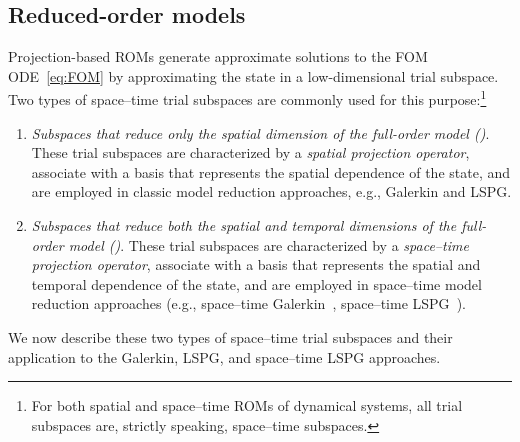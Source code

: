 \documentclass[3p,computermodern,10pt]{elsarticle}
\begin{document}
\subsection{Reduced-order models}
Projection-based ROMs generate approximate solutions to the FOM
	ODE~\eqref{eq:FOM} by approximating the state in a low-dimensional trial
	subspace. Two types of space--time trial subspaces are commonly used for
	this purpose:\footnote{For both spatial and space--time ROMs of dynamical systems, all trial subspaces are, strictly speaking, space--time subspaces.} 
\begin{enumerate} 
	\item \textit{Subspaces that reduce only the spatial dimension of the full-order
		model (\spatialAcronym)}. These trial subspaces are characterized by a \textit{spatial projection operator}, associate with a basis that represents the spatial dependence of the state, and are employed in classic model reduction approaches, e.g., Galerkin and LSPG. %
	\item \textit{Subspaces that reduce both the spatial and temporal dimensions of the full-order
		model (\spaceTimeAcronym)}.
These trial subspaces are characterized by a \textit{space--time projection operator}, associate with a basis that represents the spatial and temporal dependence of the state, and are employed in space--time 
model reduction approaches (e.g., space--time Galerkin~\cite{benner_st}, space--time LSPG~\cite{choi_stlspg}). 
\end{enumerate}
 We now describe these two types of space--time trial subspaces and their
	application to the Galerkin, LSPG, and space--time LSPG approaches. 
\end{document}
